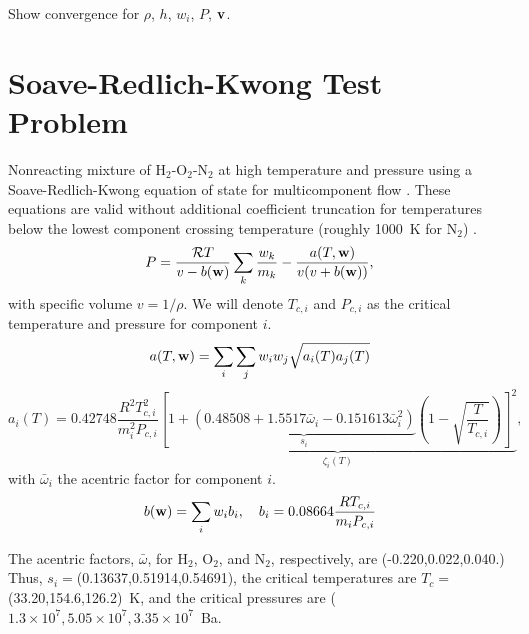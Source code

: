 \documentclass[final]{siamltex}
\def\vb {{\bf v}}
\def\wb {{\bf w}}
\begin{document}
Show convergence for $\rho$, $h$, $w_i$, $P$, $\vb$.

\section{Soave-Redlich-Kwong Test Problem}

Nonreacting mixture of H$_2$-O$_2$-N$_2$ at high temperature and pressure
using a Soave-Redlich-Kwong equation of state \cite{RedlichKwong,Soave}
for multicomponent flow \cite{GMD11}.  These equations are valid without
additional coefficient truncation for temperatures below the lowest component 
crossing temperature (roughly 1000~K for N$_2$) \cite{GMD11}.
\begin{equation}
P = \frac{\mathcal{R}T}{v-b(\wb)}\sum_k\frac{w_k}{m_k} - \frac{a(T,\wb)}{v(v+b(\wb))},
\end{equation}
with specific volume $v=1/\rho$.  We will denote $T_{c,i}$ and $P_{c,i}$ as the critical
temperature and pressure for component $i$.
\begin{equation}
a(T,\wb) = \sum_i\sum_j w_iw_j\sqrt{a_i(T)a_j(T)}
\end{equation}
\begin{equation}
a_i(T) = 0.42748\frac{R^2T_{c,i}^2}{m_i^2 P_{c,i}}\underbrace{\left[1 + \underbrace{\left(0.48508 + 1.5517\bar\omega_i - 0.151613\bar\omega_i^2\right)}_{s_i}\left(1-\sqrt{\frac{T}{T_{c,i}}}\right)\right]^2}_{\zeta_i(T)},
\end{equation}
with $\bar\omega_i$ the acentric factor for component $i$.
\begin{equation}
b(\wb) = \sum_i w_i b_i, \quad b_i = 0.08664\frac{RT_{c,i}}{m_i P_{c,i}}
\end{equation}

The acentric factors, $\bar\omega$, for H$_2$, O$_2$, and N$_2$, respectively, 
are (-0.220,0.022,0.040.)  Thus, $s_i=$(0.13637,0.51914,0.54691),
the critical temperatures are $T_{c}=$ (33.20,154.6,126.2)~K, 
and the critical pressures are ($1.3\times 10^7,5.05\times 10^7,3.35\times 10^7$~Ba.
\end{document}
